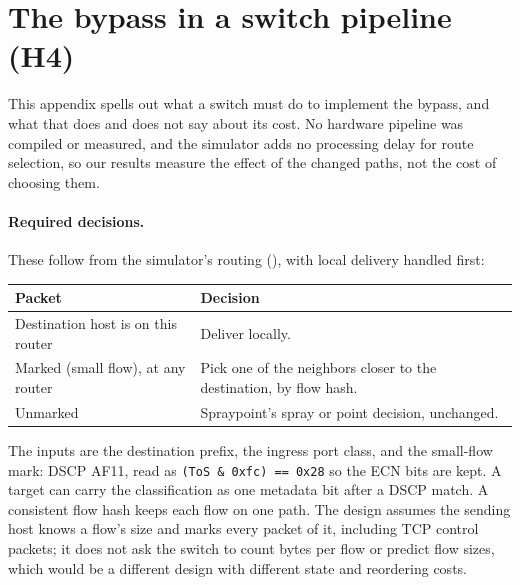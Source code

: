 \section{The bypass in a switch pipeline (H4)}
\label{app:switch}

This appendix spells out what a switch must do to implement the bypass, and what that does and does not say about its cost. No hardware pipeline was compiled or measured, and the simulator adds no processing delay for route selection, so our results measure the effect of the changed paths, not the cost of choosing them.

\paragraph{Required decisions.} These follow from the simulator's routing (), with local delivery handled first:

\begin{center}
\small
\begin{tabularx}{\linewidth}{@{}l L@{}}
\toprule
Packet & Decision \\
\midrule
Destination host is on this router & Deliver locally. \\
Marked (small flow), at any router & Pick one of the neighbors closer to the destination, by flow hash. \\
Unmarked & Spraypoint's spray or point decision, unchanged. \\
\bottomrule
\end{tabularx}
\end{center}

The inputs are the destination prefix, the ingress port class, and the small-flow mark: DSCP AF11, read as \texttt{(ToS \& 0xfc) == 0x28} so the ECN bits are kept. A target can carry the classification as one metadata bit after a DSCP match. A consistent flow hash keeps each flow on one path. The design assumes the sending host knows a flow's size and marks every packet of it, including TCP control packets; it does not ask the switch to count bytes per flow or predict flow sizes, which would be a different design with different state and reordering costs.


